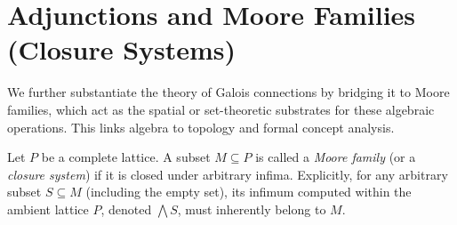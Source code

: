 \section{Adjunctions and Moore Families (Closure Systems)}

We further substantiate the theory of Galois connections by bridging it to Moore families, which act as the spatial or set-theoretic substrates for these algebraic operations. This links algebra to topology and formal concept analysis.

\begin{definition}
Let $P$ be a complete lattice. A subset $M \subseteq P$ is called a \emph{Moore family} (or a \emph{closure system}) if it is closed under arbitrary infima. Explicitly, for any arbitrary subset $S \subseteq M$ (including the empty set), its infimum computed within the ambient lattice $P$, denoted $\bigwedge S$, must inherently belong to $M$.
\end{definition}

